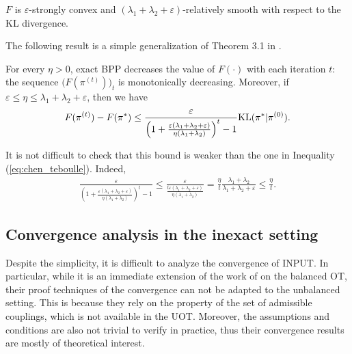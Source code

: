 \begin{lemma}
  \label{lemma:convex-smoothness}
  $F$ is $\varepsilon$-strongly convex and $(\lambda_1 + \lambda_2 + \varepsilon)$-relatively smooth
  with respect to the KL divergence.
\end{lemma}
The following result is a simple generalization of Theorem 3.1 in \citep{Lu18}.
\begin{proposition}
  \label{prop:convergence-exact-sppa}
  For every $\eta > 0$, exact BPP decreases the value of $F(\cdot)$ with each iteration $t$:
  the sequence $\big( F(\pi^{(t)}) \big)_t$ is monotonically decreasing.
  Moreover, if $\varepsilon \leq \eta \leq \lambda_1 + \lambda_2 + \varepsilon$,
  then we have
  \begin{align}
    F(\pi^{(t)}) - F(\pi^*)
    \leq \frac{\varepsilon}{\left( 1 +
    \frac{\varepsilon (\lambda_1 + \lambda_2 + \varepsilon)}{\eta (\lambda_1 + \lambda_2)} \right)^t - 1}
    \text{KL}(\pi^* | \pi^{(0)}).
  \end{align}
\end{proposition}
It is not difficult to check that this bound is weaker than the one in
Inequality (\ref{eq:chen_teboulle}). Indeed,
\begin{align}
  \frac{\varepsilon}{\left( 1 +
  \frac{\varepsilon (\lambda_1 + \lambda_2 + \varepsilon)}{\eta (\lambda_1 + \lambda_2)} \right)^t - 1}
  \leq \frac{\varepsilon}{\frac{t \varepsilon(\lambda_1 + \lambda_2 + \varepsilon)}{\eta (\lambda_1 + \lambda_2)}}
  = \frac{\eta}{t} \frac{\lambda_1 + \lambda_2}{\lambda_1 + \lambda_2 + \varepsilon}
  \leq \frac{\eta}{t}.
\end{align}

\subsection{Convergence analysis in the inexact setting}

Despite the simplicity, it is difficult to analyze the convergence of INPUT.
In particular, while it is an immediate extension of the work of \citep{Xie20} on the balanced OT,
their proof techniques of the convergence can not be adapted to the unbalanced setting.
This is because they rely on the property of the set of admissible couplings,
which is not available in the UOT. Moreover, the assumptions and conditions are also
not trivial to verify in practice, thus their convergence results are mostly of theoretical interest.

